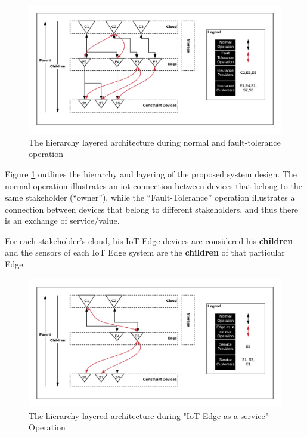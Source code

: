 \begin{figure}[h]
    \centering
    \includegraphics[width=1\textwidth]{images/layer-fault-tolerant.png}
    \caption{The hierarchy layered architecture during normal and fault-tolerance operation}
    \label{fig:hier-fault}
\end{figure}

Figure \ref{fig:hier-fault} outlines the hierarchy and layering of the proposed system design. The normal operation illustrates an \gls{iot-connection} between devices that belong to the same stakeholder (“owner”), while the “Fault-Tolerance” operation illustrates a connection between devices that belong to different stakeholders, and thus there is an exchange of service/value.
 
For each stakeholder’s cloud, his IoT Edge devices are considered his \textbf{children} and the sensors of each IoT Edge system are the \textbf{children} of that particular Edge. 

\begin{figure}[h]
    \centering
    \includegraphics[width=1\textwidth]{images/layer-service-provision.png}
    \caption{The hierarchy layered architecture during "IoT Edge as a service" Operation}
    \label{fig:hier-service}
\end{figure}


